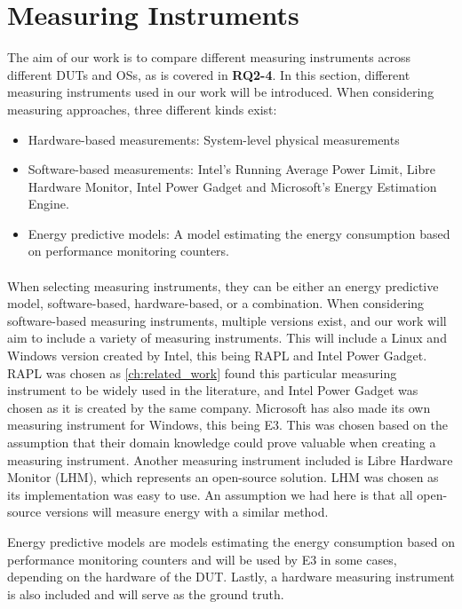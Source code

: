 \section{Measuring Instruments}\label{sec:measuring_instruments}

The aim of our work is to compare different measuring instruments across different DUTs and OSs, as is covered in \textbf{RQ2-4}. In this section, different measuring instruments used in our work will be introduced. When considering measuring approaches, three different kinds exist:

\begin{itemize}
    \item Hardware-based measurements: System-level physical measurements
    \item Software-based measurements: Intel's Running Average Power Limit, Libre Hardware Monitor, Intel Power Gadget and Microsoft's Energy Estimation Engine.
    \item Energy predictive models: A model estimating the energy consumption based on performance monitoring counters.
\end{itemize}

\paragraph*{}
When selecting measuring instruments, they can be either an energy predictive model, software-based, hardware-based, or a combination. When considering software-based measuring instruments, multiple versions exist, and our work will aim to include a variety of measuring instruments. This will include a Linux and Windows version created by Intel, this being RAPL and Intel Power Gadget. RAPL was chosen as \cref{ch:related_work} found this particular measuring instrument to be widely used in the literature, and Intel Power Gadget was chosen as it is created by the same company. Microsoft has also made its own measuring instrument for Windows, this being E3. This was chosen based on the assumption that their domain knowledge could prove valuable when creating a measuring instrument. Another measuring instrument included is Libre Hardware Monitor (LHM), which represents an open-source solution. LHM was chosen as its implementation was easy to use. An assumption we had here is that all open-source versions will measure energy with a similar method.\newline

Energy predictive models are models estimating the energy consumption based on performance monitoring counters and will be used by E3 in some cases, depending on the hardware of the DUT. Lastly, a hardware measuring instrument is also included and will serve as the ground truth.



